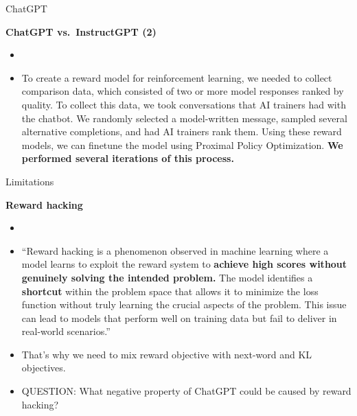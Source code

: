 \begin{vbframe}{ChatGPT}

\vfill

\textbf{ChatGPT vs.\ InstructGPT (2)}

	\begin{itemize}
		\item \href{https://openai.com/blog/chatgpt}{}
		\item
To create a reward model for reinforcement learning, we
		needed to collect comparison data, which
		consisted of two or more model responses
		ranked by quality. To collect this data, we
		took conversations that AI trainers had with
		the chatbot. We randomly selected a
		model-written message, sampled several
		alternative completions, and had AI trainers
		rank them. Using these reward models, we can
		finetune the model using Proximal Policy
		Optimization. \textbf{We performed several
		iterations of this process.}
	\end{itemize}

\vfill

\end{vbframe}


\begin{vbframe}{Limitations}

\vfill

\textbf{Reward hacking}

	\begin{itemize}
		\item \href{https://medium.com/@prdeepak.babu/reward-hacking-in-large-language-models-llms-c57abbc0cde7}{}
		\item
``Reward hacking is a phenomenon observed in machine
		learning where a model learns to exploit the
		reward system to \textbf{achieve high scores without
		genuinely solving the intended problem.} The
		model identifies a \textbf{shortcut} within the
		problem space that allows it to minimize the
		loss function without truly learning the
		crucial aspects of the problem. This issue
		can lead to models that perform well on
		training data but fail to deliver in
		real-world scenarios.''
                \item That's why we need to mix reward
		objective with next-word and KL objectives.
\item QUESTION: What negative property of ChatGPT
		could be caused by reward hacking?
	\end{itemize}

\vfill

\end{vbframe}


